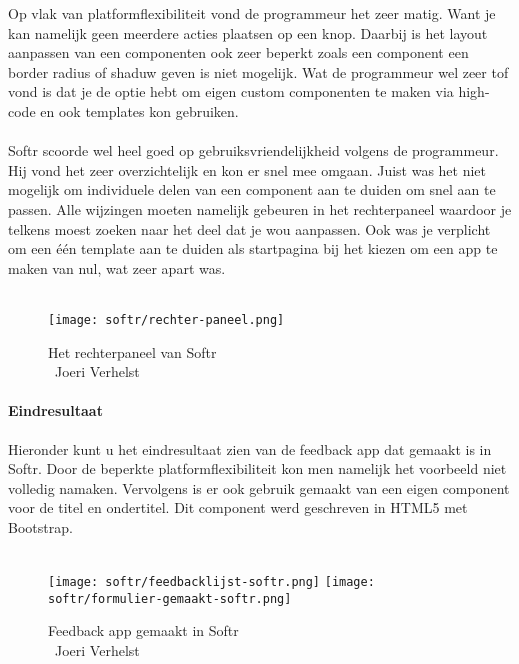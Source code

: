 Op vlak van platformflexibiliteit vond de programmeur het zeer matig. 
Want je kan namelijk geen meerdere acties plaatsen op een knop. 
Daarbij is het layout aanpassen van een componenten ook zeer beperkt zoals een component een border radius of shaduw geven is niet mogelijk. 
Wat de programmeur wel zeer tof vond is dat je de optie hebt om eigen custom componenten te maken via high-code en ook templates kon gebruiken.
\\
\\
Softr scoorde wel heel goed op gebruiksvriendelijkheid volgens de programmeur. 
Hij vond het zeer overzichtelijk en kon er snel mee omgaan. 
Juist was het niet mogelijk om individuele delen van een component aan te duiden om snel aan te passen. 
Alle wijzingen moeten namelijk gebeuren in het rechterpaneel waardoor je telkens moest zoeken naar het deel dat je wou aanpassen. 
Ook was je verplicht om een één template aan te duiden als startpagina bij het kiezen om een app te maken van nul, wat zeer apart was. 
\\
\\
\begin{figure}[H]
    \texttt{[image: softr/rechter-paneel.png]}
    \caption[Het rechterpaneel van Softr]{Het rechterpaneel van Softr\\\textcopyright\ Joeri Verhelst}
    \label{fig:softr-rechterpaneel}
\end{figure}
\paragraph*{Eindresultaat}
Hieronder kunt u het eindresultaat zien van de feedback app dat gemaakt is in Softr. Door de beperkte platformflexibiliteit kon men namelijk het voorbeeld niet volledig namaken. 
Vervolgens is er ook gebruik gemaakt van een eigen component voor de titel en ondertitel. Dit component werd geschreven in HTML5 met Bootstrap.
\\
\\

\begin{figure}[H]
    \texttt{[image: softr/feedbacklijst-softr.png]}
    \texttt{[image: softr/formulier-gemaakt-softr.png]}
    \caption[Feedback app gemaakt in Softr]{Feedback app gemaakt in Softr\\\textcopyright\ Joeri Verhelst}
    \label{fig:softr-feedback-app}
\end{figure}

